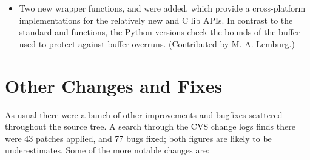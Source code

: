 \documentclass{howto}
\begin{document}
\begin{itemize}
\item
   Two new wrapper functions,  and
    were added.  which provide a
   cross-platform implementations for the relatively new
    and  C lib APIs. In
   contrast to the standard  and
    functions, the Python versions check the
   bounds of the buffer used to protect against buffer overruns.
   (Contributed by M.-A. Lemburg.)

\end{itemize}


\section{Other Changes and Fixes}

As usual there were a bunch of other improvements and bugfixes
scattered throughout the source tree.  A search through the CVS change
logs finds there were 43 patches applied, and 77 bugs fixed; both
figures are likely to be underestimates.  Some of the more notable
changes are:
\end{document}
